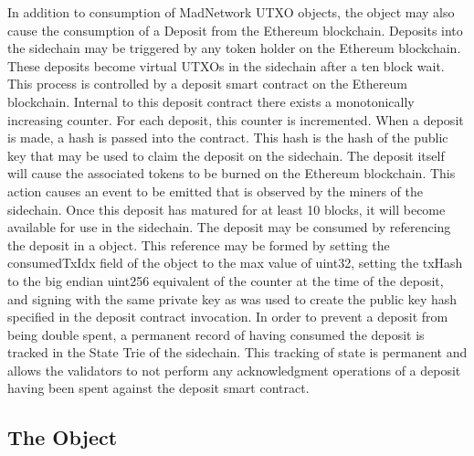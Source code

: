 In addition to consumption of MadNetwork UTXO objects, the \TxIn{} object
may also cause the consumption of a Deposit from the Ethereum
blockchain.
Deposits into the sidechain may be triggered by any token holder on the
Ethereum blockchain.
These deposits become virtual UTXOs in the sidechain after a ten block
wait.
This process is controlled by a deposit smart contract on the Ethereum
blockchain.
Internal to this deposit contract there exists a monotonically
increasing counter.
For each deposit, this counter is incremented.
When a deposit is made, a hash is passed into the contract.
This hash is the hash of the public key that may be used to claim the
deposit on the sidechain.
The deposit itself will cause the associated tokens to be burned on the
Ethereum blockchain.
This action causes an event to be emitted that is observed by the
miners of the sidechain.
Once this deposit has matured for at least 10 blocks, it will become
available for use in the sidechain.
The deposit may be consumed by referencing the deposit in a \TxIn{} object.
This reference may be formed by setting the consumedTxIdx field of the
\TxIn{} object to the max value of uint32, setting the txHash to the big
endian uint256 equivalent of the counter at the time of the deposit,
and signing with the same private key as was used to create the public
key hash specified in the deposit contract invocation.
In order to prevent a deposit from being double spent, a permanent
record of having consumed the deposit is tracked in the State Trie of
the sidechain.
This tracking of state is permanent and allows the validators to not
perform any acknowledgment operations of a deposit having been spent
against the deposit smart contract.


\subsection{The \DataStore{} Object}



